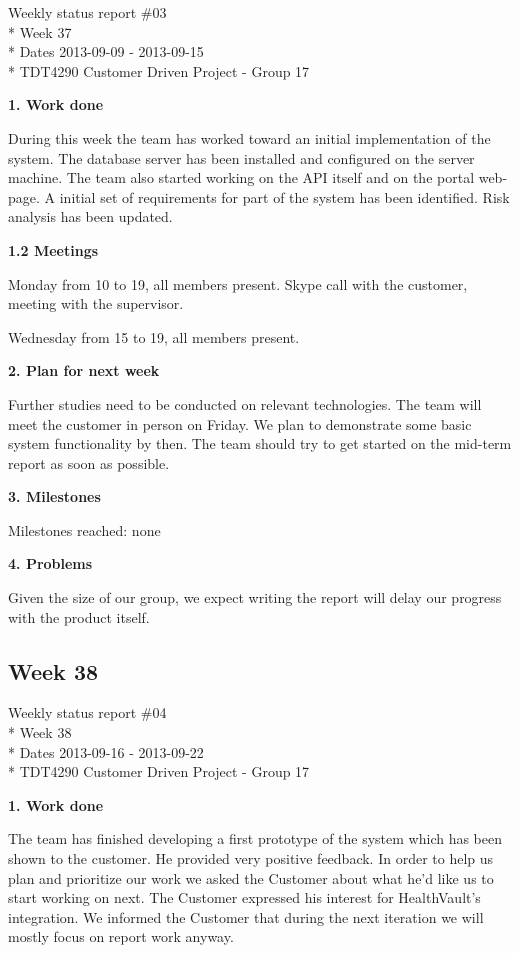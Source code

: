 \begin{center}
Weekly status report \#03\\*
Week 37 \\*
Dates 2013-09-09 - 2013-09-15 \\*
TDT4290 Customer Driven Project - Group 17
\end{center}

\textbf{1. Work done}

During this week the team has worked toward an initial implementation of the system. 
The database server has been installed and configured on the server machine. The team also started
working on the API itself and on the portal web-page. 
A initial set of requirements for part of the system has been identified. Risk analysis has been updated.

\textbf{1.2 Meetings}

Monday
from 10 to 19, all members present.
Skype call with the customer, meeting with the supervisor.

Wednesday
from 15 to 19, all members present.

\textbf{2. Plan for next week}

Further studies need to be conducted on relevant technologies. 
The team will meet the customer in person on Friday. 
We plan to demonstrate some basic system functionality by then. 
The team should try to get started on the mid-term report as soon as possible.

\textbf{3. Milestones}

Milestones reached: none

\textbf{4. Problems}

Given the size of our group, we expect writing the report will delay our progress with the product itself.

\iffalse

\newpage
\subsection{Week 38}

\begin{center}
Weekly status report \#04\\*
Week 38 \\*
Dates 2013-09-16 - 2013-09-22 \\*
TDT4290 Customer Driven Project - Group 17
\end{center}

\textbf{1. Work done}

The team has finished developing a first prototype of the system which has been shown to the customer. 
He provided very positive feedback.
In order to help us plan and prioritize our work we asked the Customer about what he’d like us to start working on next. 
The Customer expressed his interest for HealthVault's integration. 
We informed the Customer that during the next iteration we will mostly focus on report work anyway.

